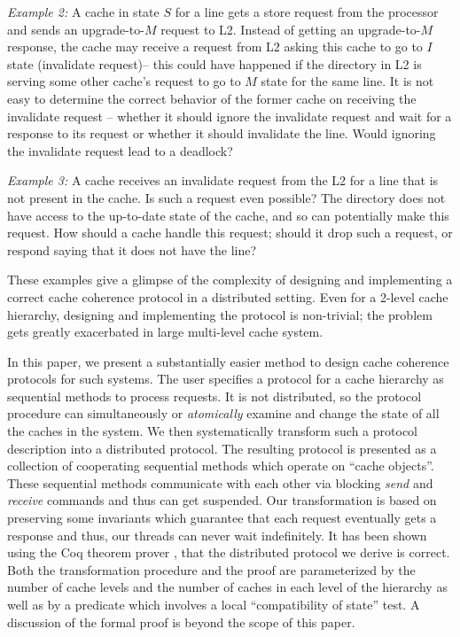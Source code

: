 \noindent \emph{Example 2:} A cache in state $S$ for a line gets a store
request from the processor and sends an upgrade-to-$M$ request to L2. Instead
of getting an upgrade-to-$M$ response, the cache may receive a request from L2
asking this cache to go to $I$ state (invalidate request)-- this could have
happened if the directory in L2 is serving some other cache's request to go to
$M$ state for the same line. It is not easy to determine the correct behavior
of the former cache on receiving the invalidate request -- whether it should
ignore the invalidate request and wait for a response to its request or whether
it should invalidate the line. Would ignoring the invalidate request lead to a
deadlock?

\noindent \emph{Example 3:} A cache receives an invalidate request from the
L2 for a line that is not present in the cache. Is such a request even
possible? The directory does not have access to the up-to-date state of the
cache, and so can potentially make this request. How should a cache handle this
request; should it drop such a request, or respond saying that it does not have
the line?

These examples give a glimpse of the complexity of designing and implementing a
correct cache coherence protocol in a distributed setting.  Even for a 2-level
cache hierarchy, designing and implementing the protocol is non-trivial; the
problem gets greatly exacerbated in large multi-level cache system. 

In this paper, we present a substantially easier method to design cache
coherence protocols for such systems. The user specifies a protocol for a cache
hierarchy as sequential methods to process requests. It is not distributed, so the protocol procedure can simultaneously or \emph{atomically}
examine and change the state of all the caches in the system. We then
systematically transform such a protocol description into a distributed protocol. The resulting protocol is presented as a collection
of cooperating sequential methods which operate on ``cache objects''.  These
sequential methods communicate with each other via blocking \emph{send} and
\emph{receive} commands and thus can get suspended. Our transformation is based
on preserving some invariants which guarantee that each request eventually gets
a response and thus, our threads can never wait indefinitely.  It has been
shown using the Coq theorem prover \cite{coq}, that the distributed protocol we
derive is correct.  Both the transformation procedure and the proof are
parameterized by the number of cache levels and the number of caches in each
level of the hierarchy as well as by a predicate which involves a local
``compatibility of state'' test. A discussion of the formal proof is beyond the
scope of this paper. 

